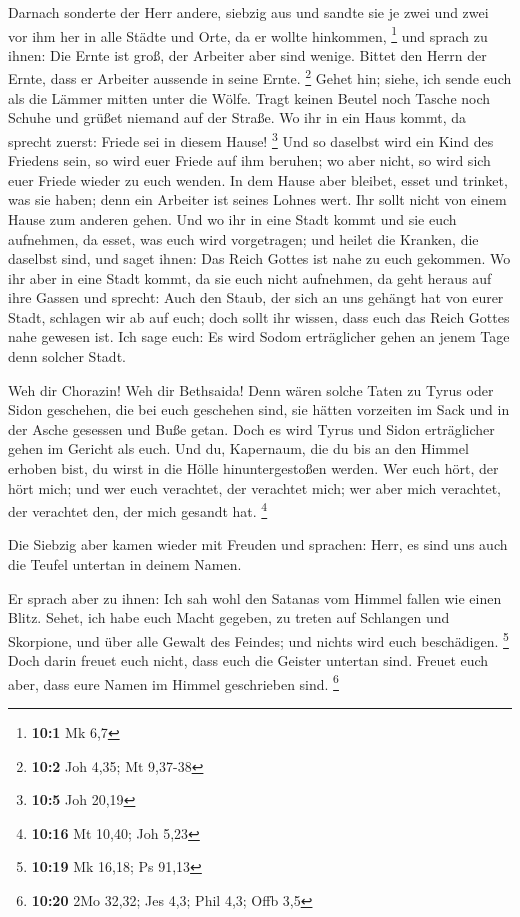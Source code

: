  Darnach sonderte der Herr andere, siebzig aus und sandte
sie je zwei und zwei vor ihm her in alle Städte und Orte, da er wollte
hinkommen, \footnote{\textbf{10:1} Mk 6,7}  und sprach zu
ihnen: Die Ernte ist groß, der Arbeiter aber sind wenige. Bittet den
Herrn der Ernte, dass er Arbeiter aussende in seine Ernte. \footnote{\textbf{10:2}
  Joh 4,35; Mt 9,37-38}  Gehet hin; siehe, ich sende euch
als die Lämmer mitten unter die Wölfe.  Tragt keinen
Beutel noch Tasche noch Schuhe und grüßet niemand auf der Straße.
 Wo ihr in ein Haus kommt, da sprecht zuerst: Friede sei
in diesem Hause! \footnote{\textbf{10:5} Joh 20,19}  Und
so daselbst wird ein Kind des Friedens sein, so wird euer Friede auf ihm
beruhen; wo aber nicht, so wird sich euer Friede wieder zu euch wenden.
 In dem Hause aber bleibet, esset und trinket, was sie
haben; denn ein Arbeiter ist seines Lohnes wert. Ihr sollt nicht von
einem Hause zum anderen gehen.  Und wo ihr in eine Stadt
kommt und sie euch aufnehmen, da esset, was euch wird vorgetragen;
 und heilet die Kranken, die daselbst sind, und saget
ihnen: Das Reich Gottes ist nahe zu euch gekommen.  Wo
ihr aber in eine Stadt kommt, da sie euch nicht aufnehmen, da geht
heraus auf ihre Gassen und sprecht:  Auch den Staub, der
sich an uns gehängt hat von eurer Stadt, schlagen wir ab auf euch; doch
sollt ihr wissen, dass euch das Reich Gottes nahe gewesen ist.
 Ich sage euch: Es wird Sodom erträglicher gehen an jenem
Tage denn solcher Stadt.

 Weh dir Chorazin! Weh dir Bethsaida! Denn wären solche
Taten zu Tyrus oder Sidon geschehen, die bei euch geschehen sind, sie
hätten vorzeiten im Sack und in der Asche gesessen und Buße getan.
 Doch es wird Tyrus und Sidon erträglicher gehen im
Gericht als euch.  Und du, Kapernaum, die du bis an den
Himmel erhoben bist, du wirst in die Hölle hinuntergestoßen werden.
 Wer euch hört, der hört mich; und wer euch verachtet,
der verachtet mich; wer aber mich verachtet, der verachtet den, der mich
gesandt hat. \footnote{\textbf{10:16} Mt 10,40; Joh 5,23}

 Die Siebzig aber kamen wieder mit Freuden und sprachen:
Herr, es sind uns auch die Teufel untertan in deinem Namen.

 Er sprach aber zu ihnen: Ich sah wohl den Satanas vom
Himmel fallen wie einen Blitz.  Sehet, ich habe euch
Macht gegeben, zu treten auf Schlangen und Skorpione, und über alle
Gewalt des Feindes; und nichts wird euch beschädigen. \footnote{\textbf{10:19}
  Mk 16,18; Ps 91,13}  Doch darin freuet euch nicht, dass
euch die Geister untertan sind. Freuet euch aber, dass eure Namen im
Himmel geschrieben sind. \footnote{\textbf{10:20} 2Mo 32,32; Jes 4,3;
  Phil 4,3; Offb 3,5}

